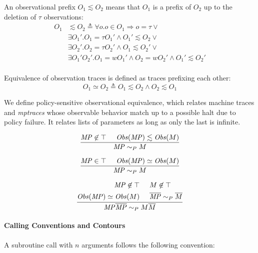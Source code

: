 \documentclass[conference]{IEEEtran}
\newcommand{\MP}{\mathit{MP}}
\begin{document}
    An observational prefix \(O_1 \lesssim O_2\) means that \(O_1\) is a prefix of \(O_2\) up to the deletion
    of \(\tau\) observations:
    \[\begin{split}
      O_1 & \lesssim O_2 \triangleq \forall o . o \in O_1 \Rightarrow o = \tau \lor \\
      & \exists O_1' . O_1 = \tau O_1' \land O_1' \lesssim O_2 \lor \\
      & \exists O_2' .  O_2 = \tau O_2' \land O_1 \lesssim O_2' \lor \\
      & \exists O_1' O_2' . O_1 = w O_1' \land O_2 = w O_2' \land O_1' \lesssim O_2' \\
    \end{split}\]
    
    Equivalence of observation traces is defined as traces prefixing each other:
    \[O_1 \simeq O_2 \triangleq O_1 \lesssim O_2 \land O_2 \lesssim O_1\]

    We define policy-sensitive observational equivalence, which relates machine traces and
    {\it mptraces} whose observable behavior match up to a possible halt due to policy failure.
    It relates lists of parameters as long as only the last is infinite.

    \[\frac{\MP \not \in \top \hspace{.5cm} \mathit{Obs}(\MP) \lesssim \mathit{Obs}(M)}
           {\MP \sim_P M}\]
    
    \[\frac{\MP \in \top \hspace{.5cm} \mathit{Obs}(\MP) \simeq \mathit{Obs}(M)}
           {\MP \sim_P M}\]
    
    \[\frac{\begin{split}
              \MP \not \in \top & \hspace{.5cm} M \not \in \top \\
              \mathit{Obs}(\MP) \simeq \mathit{Obs}(M) & \hspace{.5cm} \overline{\MP} \sim_P \overline{M} \\
            \end{split}}
           {\MP \overline{\MP} \sim_P M \overline{M}}\]

  \paragraph{Calling Conventions and Contours}

      A subroutine call with \(n\) arguments follows the following convention:
\end{document}
